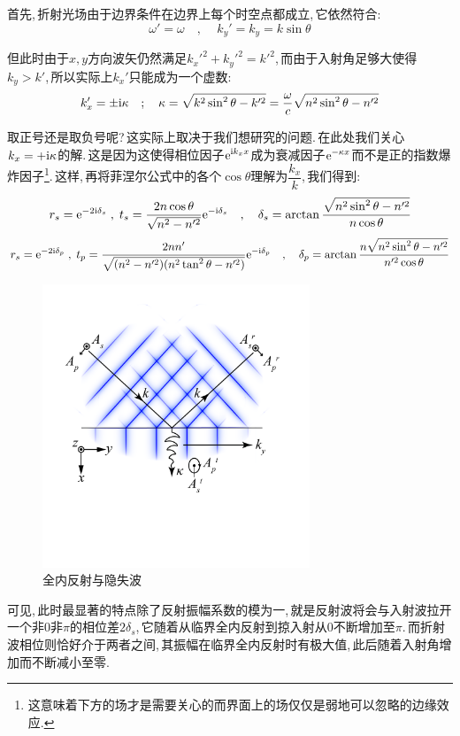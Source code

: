 首先,\,折射光场由于边界条件在边界上每个时空点都成立,\,它依然符合:
\[\omega'=\omega\quad ,\,\quad k_y'=k_y=k\sin\theta\]

但此时由于\(x,y\)方向波矢仍然满足\(\displaystyle k_x'^2+k_y'^2=k'^2\),\,而由于入射角足够大使得\(k_y>k'\),\,所以实际上$k_x'$只能成为一个虚数:
\[k_x'=\pm{\rm i} \kappa\quad ;\quad \kappa=\sqrt{k^2\sin^2\theta-k'^2}=\frac{\omega}{c}\sqrt{n^2\sin^2\theta-n'^2}\]

取正号还是取负号呢?\,这实际上取决于我们想研究的问题.\,在此处我们关心\(k_x=+{\rm i}\kappa\)的解.\,这是因为这使得相位因子\(\displaystyle {\rm e}^{{\rm i} k_x x}\)成为衰减因子\(\displaystyle {\rm e}^{- \kappa x}\)而不是正的指数爆炸因子\footnote{这意味着下方的场才是需要关心的而界面上的场仅仅是弱地可以忽略的边缘效应.}.\,这样,\,再将菲涅尔公式中的各个\(\cos\theta\)理解为\(\dfrac{k_x}{k}\),\,我们得到:
\[r_s={\rm e}^{-2{\rm i} \delta_s}\; ,\; t_s=\frac{2n\cos\theta}{\sqrt{n^2-n'^2}}{\rm e}^{-{\rm i}\delta_s} \quad,\quad\delta_s=\arctan\frac{\sqrt{n^2\sin^2\theta-n'^2}}{n\cos\theta}\]
\[r_s={\rm e}^{-2{\rm i} \delta_p}\; ,\; t_p=\frac{2nn'}{\sqrt{(n^2-n'^2)(n^2\tan^2\theta-n'^2)}}{\rm e}^{-{\rm i}\delta_p} \quad,\quad\delta_p=\arctan\frac{n\sqrt{n^2\sin^2\theta-n'^2}}{n'^2\cos\theta}\]

\vspace{0.5cm}
\begin{figure}
\centering
\vspace{-1cm}
\includegraphics[width=8cm]{image/5-6-7.png}
\vspace{-3cm}
\caption{全内反射与隐失波}
\end{figure}
可见,\,此时最显著的特点除了反射振幅系数的模为一,\,就是反射波将会与入射波拉开一个非$0$非$\pi$的相位差\(2\delta_s\),\,它随着从临界全内反射到掠入射从$0$不断增加至$\pi$.\,而折射波相位则恰好介于两者之间,\,其振幅在临界全内反射时有极大值,\,此后随着入射角增加而不断减小至零.

